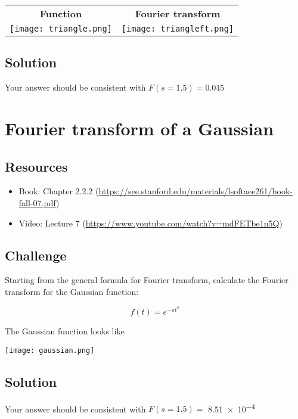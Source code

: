 \begin{tabular}{cc}
    \textbf{Function} & \textbf{Fourier transform} \\
    \texttt{[image: triangle.png]} & \texttt{[image: triangleft.png]}
\end{tabular}

\subsection*{Solution}
Your answer should be consistent with $F(s=1.5) = 0.045$




\newpage
\section{Fourier transform of a Gaussian}

\subsection*{Resources}
\begin{itemize}
    \item Book: Chapter 2.2.2 (\url{https://see.stanford.edu/materials/lsoftaee261/book-fall-07.pdf})
    \item Video: Lecture 7 (\url{https://www.youtube.com/watch?v=mdFETbe1n5Q})
\end{itemize}

\subsection*{Challenge}
Starting from the general formula for Fourier transform, calculate the Fourier transform for the Gaussian function:

\begin{equation}
    f(t) = e^{-\pi t^2}
\end{equation}

The Gaussian function looks like

\texttt{[image: gaussian.png]}

\subsection*{Solution}
Your answer should be consistent with $F(s=1.5) =$ \num{8.51e-4}




\newpage
